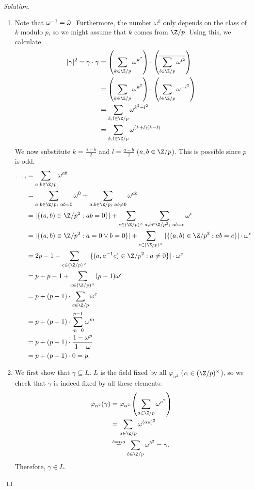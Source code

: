 \documentclass[a4paper,10pt,reqno]{amsart}
\newenvironment{sol}
  {\renewcommand\qedsymbol{$\blacksquare$}\begin{proof}[Solution]}
  {\end{proof}}
\begin{document}
\begin{sol}
\begin{enumerate}[label=(\roman*)]
    \item Note that $\omega^{-1} = \Bar{\omega}$. Furthermore, the number $\omega^k$ only depends on the class of $k$ modulo $p$, so we might assume that $k$ comes from $\Z/p$. Using this, we calculate
    \begin{align*}
        |\gamma|^2 = \gamma \cdot \Bar{\gamma} & = \left( \sum_{k \in \Z/p} \omega^{k^2} \right) \cdot \left( \overline{\sum_{l \in \Z/p} \omega^{l^2}} \right) \\
        & = \left( \sum_{k \in \Z/p} \omega^{k^2} \right) \cdot \left( \sum_{l \in \Z/p} \omega^{-l^2} \right) \\
        & = \sum_{k,l \in \Z/p} \omega^{k^2 -l^2} \\
        & = \sum_{k,l \in \Z/p} \omega^{(k+l)(k-l)}
    \end{align*}
    We now substitute $k = \frac{a+b}{2}$ and $l = \frac{a-b}{2}$ ($a,b \in \Z/p$). This is possible since $p$ is odd.
    \begin{align*}
        \ldots,& = \sum_{a,b \in \Z/p}\omega^{ab} \\
        & = \sum_{a,b \in \Z/p;\  ab = 0} \omega^0 + \sum_{a,b \in \Z/p;\ ab \neq 0} \omega^{ab} \\
        & = |\{ (a,b) \in \Z/p^2 : ab = 0 \}| + \sum_{c \in (\Z/p)^{\times}} \sum_{a,b \in \Z/p^2;\ ab = c} \omega^c  \\
        & = |\{ (a,b) \in \Z/p^2 : a = 0 \vee b = 0 \}| + \sum_{c \in (\Z/p)^{\times}} |\{(a,b) \in \Z/p^2: ab = c \}|\cdot \omega^c \\
        & = 2p - 1 +  \sum_{c \in (\Z/p)^{\times}} |\{(a,a^{-1}c) \in \Z/p^2: a \neq 0 \}|\cdot \omega^c \\
        & = p + p-1 + \sum_{c \in (\Z/p)^{\times}} (p-1) \omega^c \\
        & = p + (p-1) \cdot \sum_{c \in \Z/p} \omega^c \\
        & = p + (p-1) \cdot \sum_{m=0}^{p-1}\omega^m \\
        & = p + (p-1) \cdot \frac{1-\omega^p}{1-\omega} \\
        & = p + (p-1) \cdot 0 = p.
    \end{align*}
    \item We first show that $\gamma \subseteq L$. $L$ is the field fixed by all $\varphi_{\alpha^2}$ ($\alpha \in (\Z/p)^{\times}$), so we check that $\gamma$ is indeed fixed by all these elements:
    \begin{align*}
        \varphi_{\alpha^2}(\gamma) & = \varphi_{\alpha^2}\left( \sum_{a \in \Z/p} \omega^{a^2} \right) \\
        & = \sum_{a \in \Z/p} \omega^{(\alpha a)^2} \\
        & \overset{b = \alpha a}{=} \sum_{b \in \Z/p} \omega^{b^2} = \gamma.
    \end{align*}
    Therefore, $\gamma \in L$.


\end{enumerate}
\end{sol}
\end{document}
